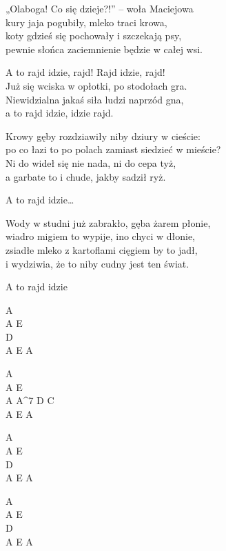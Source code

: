 \begin{text}
	„Olaboga! Co się dzieje?!” – woła Maciejowa\\
	kury jaja pogubiły, mleko traci krowa,\\
	koty gdzieś się pochowały i szczekają psy,\\
	pewnie słońca zaciemnienie będzie w całej wsi.

	\vin A to rajd idzie, rajd! Rajd idzie, rajd!\\
	\vin Już się wciska w opłotki, po stodołach gra.\\
	\vin Niewidzialna jakaś siła ludzi naprzód gna,\\
	\vin a to rajd idzie, idzie rajd.

	Krowy gęby rozdziawiły niby dziury w cieście:\\
	po co łazi to po polach zamiast siedzieć w mieście?\\
	Ni do wideł się nie nada, ni do cepa tyż,\\
	a garbate to i chude, jakby sadził ryż.

	\vin A to rajd idzie…

	Wody w studni już zabrakło, gęba żarem płonie,\\
	wiadro migiem to wypije, ino chyci w dłonie,\\
	zsiadłe mleko z kartoflami cięgiem by to jadł,\\
	i wydziwia, że to niby cudny jest ten świat.

	\vin A to rajd idzie
\end{text}
\begin{chord}
    A\\
    A E\\
    D\\
    A E A

    A\\
    A E\\
    A A^7 D C\\
    A E A

    A\\
    A E\\
    D\\
    A E A\\
    \hfill\break

    A\\
    A E\\
    D\\
    A E A
\end{chord}

